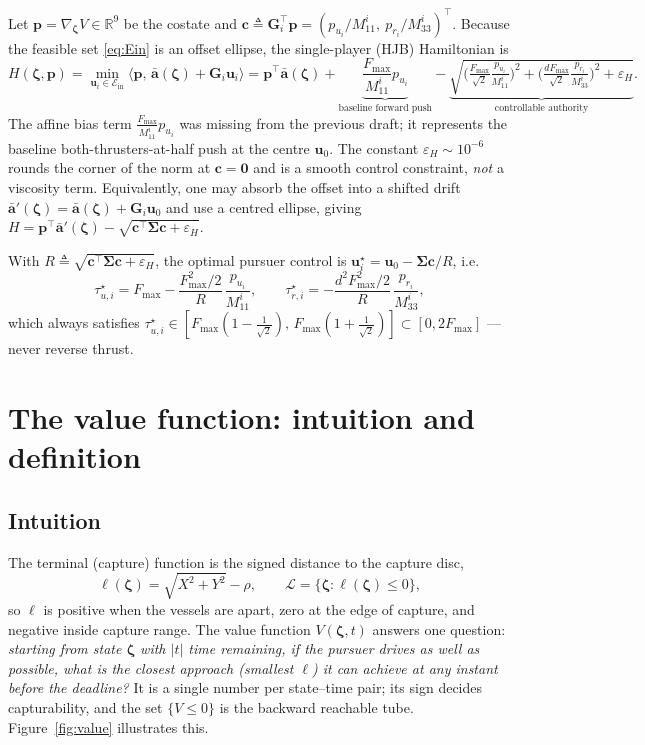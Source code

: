\documentclass[11pt]{article}
\newcommand{\R}{\mathbb{R}}
\newcommand{\Ein}{\mathcal{E}_{\mathrm{in}}}
\newcommand{\zbf}{\bm{\zeta}}
\newcommand{\abf}{\bar{\bm{a}}}
\newcommand{\Gbf}{\bm{G}}
\newcommand{\ubf}{\bm{u}}
\newcommand{\pbf}{\bm{p}}
\newcommand{\inner}[2]{\langle #1,\, #2\rangle}
\begin{document}
Let $\pbf=\nabla_{\zbf}V\in\R^9$ be the costate and
$\bm{c}\triangleq\Gbf_i^\top\pbf=(p_{u_i}/M_{11}^i,\ p_{r_i}/M_{33}^i)^\top$. Because the feasible
set \eqref{eq:Ein} is an offset ellipse, the single-player (HJB) Hamiltonian is
\begin{equation}\label{eq:ham}
H(\zbf,\pbf)=\min_{\ubf_i\in\Ein}\inner{\pbf}{\abf(\zbf)+\Gbf_i\ubf_i}
=\pbf^\top\abf(\zbf)
+\underbrace{\frac{F_{\max}}{M_{11}^i}p_{u_i}}_{\text{baseline forward push}}
-\underbrace{\sqrt{\Big(\tfrac{F_{\max}}{\sqrt2}\tfrac{p_{u_i}}{M_{11}^i}\Big)^2
+\Big(\tfrac{dF_{\max}}{\sqrt2}\tfrac{p_{r_i}}{M_{33}^i}\Big)^2+\varepsilon_H}}_{\text{controllable authority}} .
\end{equation}
The affine bias term $\tfrac{F_{\max}}{M_{11}^i}p_{u_i}$ was missing from the previous draft; it
represents the baseline both-thrusters-at-half push at the centre $\ubf_0$. The constant
$\varepsilon_H\sim10^{-6}$ rounds the corner of the norm at $\bm{c}=\bm 0$ and is a smooth control
constraint, \emph{not} a viscosity term. Equivalently, one may absorb the offset into a shifted
drift $\abf'(\zbf)=\abf(\zbf)+\Gbf_i\ubf_0$ and use a centred ellipse, giving
$H=\pbf^\top\abf'(\zbf)-\sqrt{\bm{c}^\top\bm{\Sigma}\bm{c}+\varepsilon_H}$.

With $R\triangleq\sqrt{\bm{c}^\top\bm{\Sigma}\bm{c}+\varepsilon_H}$, the optimal pursuer control is
$\ubf_i^\star=\ubf_0-\bm{\Sigma}\bm{c}/R$, i.e.
\begin{equation}
\tau_{u,i}^\star=F_{\max}-\frac{F_{\max}^2/2}{R}\,\frac{p_{u_i}}{M_{11}^i},\qquad
\tau_{r,i}^\star=-\frac{d^2F_{\max}^2/2}{R}\,\frac{p_{r_i}}{M_{33}^i},
\end{equation}
which always satisfies $\tau_{u,i}^\star\in[F_{\max}(1-\tfrac{1}{\sqrt2}),\,F_{\max}(1+\tfrac{1}{\sqrt2})]\subset[0,2F_{\max}]$ --- never reverse thrust.

\section{The value function: intuition and definition}

\subsection{Intuition}

The terminal (capture) function is the signed distance to the capture disc,
\begin{equation}
\ell(\zbf)=\sqrt{X^2+Y^2}-\rho,\qquad \mathcal{L}=\{\zbf:\ell(\zbf)\le0\},
\end{equation}
so $\ell$ is positive when the vessels are apart, zero at the edge of capture, and negative inside
capture range. The value function $V(\zbf,t)$ answers one question: \emph{starting from state
$\zbf$ with $|t|$ time remaining, if the pursuer drives as well as possible, what is the closest
approach (smallest $\ell$) it can achieve at any instant before the deadline?} It is a single
number per state--time pair; its sign decides capturability, and the set $\{V\le0\}$ is the
backward reachable tube. Figure~\ref{fig:value} illustrates this.
\end{document}
